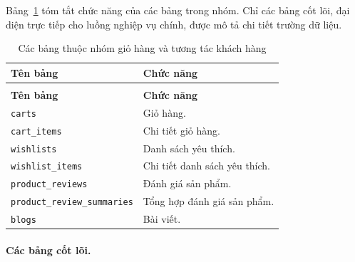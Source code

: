Bảng~\ref{tab:data-summary-cart-engagement} tóm tắt chức năng của các bảng trong nhóm. Chỉ các bảng cốt lõi, đại diện trực tiếp cho luồng nghiệp vụ chính, được mô tả chi tiết trường dữ liệu.

\begin{longtable}{|>{\RaggedRight\arraybackslash}p{}|>{\RaggedRight\arraybackslash}p{}|}
    \caption{Các bảng thuộc nhóm giỏ hàng và tương tác khách hàng}
    \label{tab:data-summary-cart-engagement} \\
    \hline
    \textbf{Tên bảng} & \textbf{Chức năng} \\
    \hline
    \endfirsthead
    \multicolumn{2}{c}{\tablename\ \thetable\ (tiếp theo)} \\
    \hline
    \textbf{Tên bảng} & \textbf{Chức năng} \\
    \hline
    \endhead
    \texttt{carts} & Giỏ hàng. \\
    \hline
    \texttt{cart\_items} & Chi tiết giỏ hàng. \\
    \hline
    \texttt{wishlists} & Danh sách yêu thích. \\
    \hline
    \texttt{wishlist\_items} & Chi tiết danh sách yêu thích. \\
    \hline
    \texttt{product\_reviews} & Đánh giá sản phẩm. \\
    \hline
    \texttt{product\_review\_summaries} & Tổng hợp đánh giá sản phẩm. \\
    \hline
    \texttt{blogs} & Bài viết. \\
    \hline
\end{longtable}

\paragraph{Các bảng cốt lõi.}

